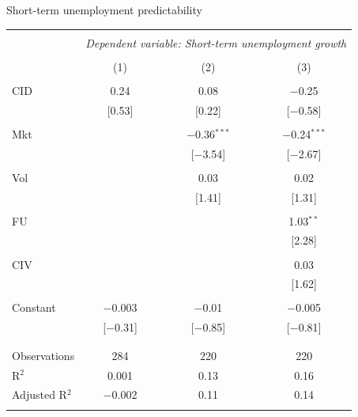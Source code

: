 \documentclass{beamer}
\begin{document}
\scriptsize
\begin{frame}{Short-term unemployment predictability}
\begin{table}[!htbp] \centering 
  \label{} 
\begin{tabular}{@{\extracolsep{5pt}}lccc} 
\\[-1.8ex]\hline 
\hline \\[-1.8ex] 
 & \multicolumn{3}{c}{\textit{Dependent variable: Short-term unemployment growth}} \\ 
\cline{2-4} 
\\[-1.8ex] & (1) & (2) & (3)\\ 
\hline \\[-1.8ex] 
 CID & 0.24 & 0.08 & $-$0.25 \\ 
  & [0.53] & [0.22] & [$-$0.58] \\ 
  & & & \\ 
 Mkt &  & $-$0.36$^{***}$ & $-$0.24$^{***}$ \\ 
  &  & [$-$3.54] & [$-$2.67] \\ 
  & & & \\ 
 Vol &  & 0.03 & 0.02 \\ 
  &  & [1.41] & [1.31] \\ 
  & & & \\ 
 FU &  &  & 1.03$^{**}$ \\ 
  &  &  & [2.28] \\ 
  & & & \\ 
 CIV &  &  & 0.03 \\ 
  &  &  & [1.62] \\ 
  & & & \\ 
 Constant & $-$0.003 & $-$0.01 & $-$0.005 \\ 
  & [$-$0.31] & [$-$0.85] & [$-$0.81] \\ 
  & & & \\ 
\hline \\[-1.8ex] 
Observations & 284 & 220 & 220 \\ 
R$^{2}$ & 0.001 & 0.13 & 0.16 \\ 
Adjusted R$^{2}$ & $-$0.002 & 0.11 & 0.14 \\ 
\hline 
\hline \\[-1.8ex] 
\end{tabular} 
\end{table}
\end{frame}


\renewcommand{\arraystretch}{1.00}
\end{document}
